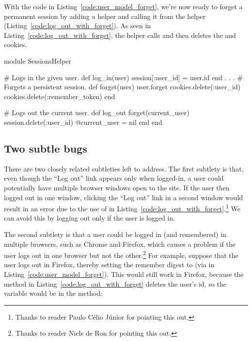 With the code in Listing~\ref{code:user_model_forget}, we're now ready to forget a permanent session by adding a  helper and calling it from the  helper (Listing~\ref{code:log_out_with_forget}). As seen in Listing~\ref{code:log_out_with_forget}, the  helper calls  and then deletes the  and  cookies.

\begin{codelisting}
\label{code:log_out_with_forget}
\begin{code}
module SessionsHelper

  # Logs in the given user.
  def log_in(user)
    session[:user_id] = user.id
  end
  .
  .
  .
  # Forgets a persistent session.
  def forget(user)
    user.forget
    cookies.delete(:user_id)
    cookies.delete(:remember_token)
  end

  # Logs out the current user.
  def log_out
    forget(current_user)
    session.delete(:user_id)
    @current_user = nil
  end
end
\end{code}
\end{codelisting}


\subsection{Two subtle bugs} %
\label{sec:two_subtle_bugs}

There are two closely related subtleties left to address. The first subtlety is that, even though the ``Log out'' link appears only when logged-in, a user could potentially have multiple browser windows open to the site. If the user then logged out in one window, clicking the ``Log out'' link in a second window would result in an error due to the use of  in Listing~\ref{code:log_out_with_forget}.\footnote{Thanks to reader Paulo Célio Júnior for pointing this out.} We can avoid this by logging out only if the user is logged in.

The second subtlety is that a user could be logged in (and remembered) in multiple browsers, such as Chrome and Firefox, which causes a problem if the user logs out in one browser but not the other.\footnote{Thanks to reader Niels de Ron for pointing this out.} For example, suppose that the user logs out in Firefox, thereby setting the remember digest to  (via  in Listing~\ref{code:user_model_forget}). This would still work in Firefox, because the  method in Listing~\ref{code:log_out_with_forget} deletes the user's id, so the  variable would be  in the  method:

